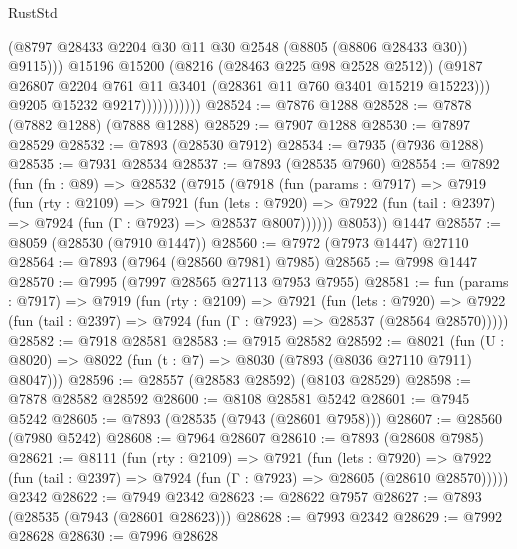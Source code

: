 \begin{lexlean}{RustStd}
\begin{coremodule}
                                (@8797
                                  @28433
                                  @2204
                                  @30
                                  @11
                                  @30
                                  @2548
                                  (@8805 (@8806 @28433 @30))
                                  @9115)))
                            @15196
                            @15200
                            (@8216 (@28463 @225 @98 @2528 @2512))
                            (@9187
                              @26807
                              @2204
                              @761
                              @11
                              @3401
                              (@28361 @11 @760 @3401 @15219 @15223)))
                          @9205
                          @15232
                          @9217)))))))))))
@28524 := @7876 @1288
@28528 := @7878 (@7882 @1288) (@7888 @1288)
@28529 := @7907 @1288
@28530 := @7897 @28529
@28532 := @7893 (@28530 @7912)
@28534 := @7935 (@7936 @1288)
@28535 := @7931 @28534
@28537 := @7893 (@28535 @7960)
@28554 := @7892
    (fun (fn : @89) =>
    @28532
      (@7915
        (@7918
          (fun (params : @7917) =>
          @7919
            (fun (rty : @2109) =>
            @7921
              (fun (lets : @7920) =>
              @7922 (fun (tail : @2397) => @7924 (fun (Γ : @7923) => @28537 @8007))))))
        @8053))
    @1447
@28557 := @8059 (@28530 (@7910 @1447))
@28560 := @7972 (@7973 @1447) @27110
@28564 := @7893 (@7964 (@28560 @7981) @7985)
@28565 := @7998 @1447
@28570 := @7995 (@7997 @28565 @27113 @7953 @7955)
@28581 := fun (params : @7917) =>
  @7919
    (fun (rty : @2109) =>
    @7921
      (fun (lets : @7920) =>
      @7922 (fun (tail : @2397) => @7924 (fun (Γ : @7923) => @28537 (@28564 @28570)))))
@28582 := @7918 @28581
@28583 := @7915 @28582
@28592 := @8021
    (fun (U : @8020) => @8022 (fun (t : @7) => @8030 (@7893 (@8036 @27110 @7911) @8047)))
@28596 := @28557 (@28583 @28592) (@8103 @28529)
@28598 := @7878 @28582 @28592
@28600 := @8108 @28581 @5242
@28601 := @7945 @5242
@28605 := @7893 (@28535 (@7943 (@28601 @7958)))
@28607 := @28560 (@7980 @5242)
@28608 := @7964 @28607
@28610 := @7893 (@28608 @7985)
@28621 := @8111
    (fun (rty : @2109) =>
    @7921
      (fun (lets : @7920) =>
      @7922 (fun (tail : @2397) => @7924 (fun (Γ : @7923) => @28605 (@28610 @28570)))))
    @2342
@28622 := @7949 @2342
@28623 := @28622 @7957
@28627 := @7893 (@28535 (@7943 (@28601 @28623)))
@28628 := @7993 @2342
@28629 := @7992 @28628
@28630 := @7996 @28628

\end{coremodule}
\end{lexlean}
